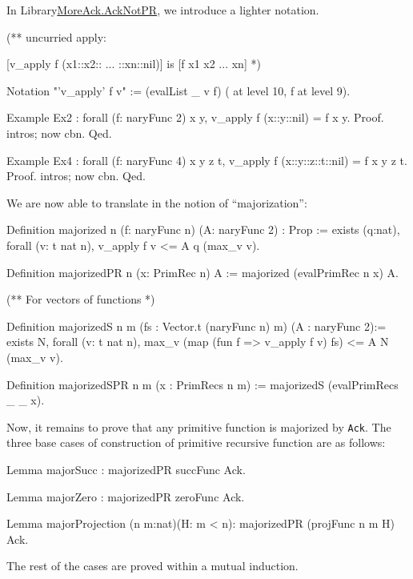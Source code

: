 In Library\href{../theories/html/hydras.MoreAck.AckNotPR.html}{MoreAck.AckNotPR}, we introduce a lighter notation.

\begin{Coqsrc}
(**  uncurried apply:
 
[v_apply f (x1::x2:: ... ::xn::nil)]  is [f x1 x2 ... xn] 
 *)

Notation "'v_apply' f v" := (evalList _ v f) ( at level 10, f at level 9).

Example Ex2 : forall (f: naryFunc 2) x y,
    v_apply f (x::y::nil) = f x y.
Proof.   intros; now cbn. Qed.

Example Ex4 : forall (f: naryFunc 4) x y z t,
    v_apply f (x::y::z::t::nil) = f x y z t.
Proof.  intros; now cbn. Qed.
\end{Coqsrc}

We are now able to translate in \gallina{} the notion of ``majorization'':

\begin{Coqsrc}
Definition majorized {n} (f: naryFunc n) (A: naryFunc 2) : Prop :=
  exists (q:nat), forall (v: t nat n),
      v_apply f v <= A q  (max_v v).

Definition majorizedPR {n} (x: PrimRec n) A := 
           majorized (evalPrimRec n x) A.

(** For vectors of functions *)

Definition majorizedS {n m} (fs : Vector.t (naryFunc n) m)
           (A : naryFunc 2):=
  exists N, forall (v: t nat n),
      max_v (map (fun f => v_apply f v) fs) <= A N (max_v v).

Definition majorizedSPR {n m} (x : PrimRecs n m) :=
  majorizedS (evalPrimRecs _ _ x).
\end{Coqsrc}

Now, it remains to prove that any primitive function is majorized by \texttt{Ack}.
The three base cases of construction of primitive recursive function are as follows:

\begin{Coqsrc}
Lemma majorSucc : majorizedPR  succFunc Ack.

Lemma majorZero : majorizedPR  zeroFunc Ack.

Lemma majorProjection (n m:nat)(H: m < n):
  majorizedPR (projFunc n m H) Ack.
\end{Coqsrc}


The rest of the cases are proved within a mutual  induction.

